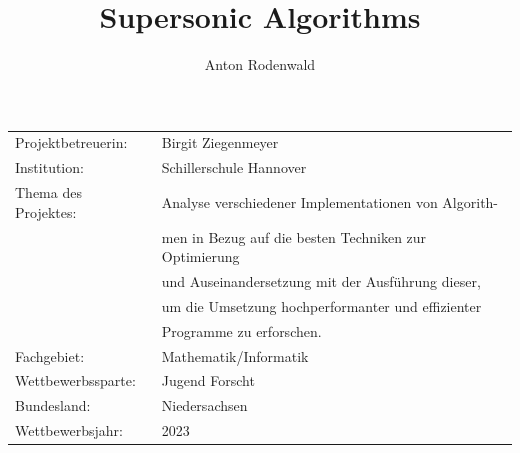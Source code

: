\documentclass[12pt,a4paper]{article}
\begin{document}
\title{Supersonic Algorithms}
\author{Anton Rodenwald}

\maketitle

\large\begin{tabular}{l l}

    Projektbetreuerin: & Birgit Ziegenmeyer \\

    Institution: & Schillerschule Hannover \\
    
    Thema des Projektes: 
    & Analyse verschiedener Implementationen von Algorith- \\
    & men in Bezug auf die besten Techniken zur Optimierung \\
    & und Auseinandersetzung mit der Ausführung dieser, \\
    & um die Umsetzung hochperformanter und effizienter \\
    & Programme zu erforschen. \\

    Fachgebiet: & Mathematik/Informatik \\

    Wettbewerbssparte: & Jugend Forscht \\
    
    Bundesland: & Niedersachsen \\
    
    Wettbewerbsjahr: & 2023 \\
    
\end{tabular}


\clearpage
\end{document}
